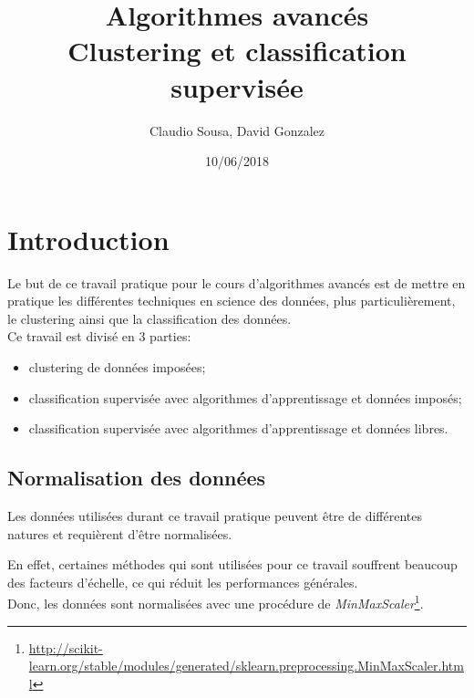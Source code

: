 \documentclass[11pt, a4paper]{article}
\begin{document}
\title
{
    \Huge{Algorithmes avancés} \\
    \Huge{Clustering et classification supervisée}
}
\author
{
    \LARGE{Claudio Sousa, David Gonzalez}
}
\date{10/06/2018}
\maketitle

\thispagestyle{empty}


\newpage

\section{Introduction}

Le but de ce travail pratique pour le cours d'algorithmes avancés est de mettre en pratique
les différentes techniques en science des données,
plus particulièrement, le clustering ainsi que la classification des données. \\

Ce travail est divisé en 3 parties:
\begin{itemize}
    \item clustering de données imposées;
    \item classification supervisée avec algorithmes d'apprentissage et données imposés;
    \item classification supervisée avec algorithmes d'apprentissage et données libres.
\end{itemize}

\subsection{Normalisation des données}

Les données utilisées durant ce travail pratique peuvent être de différentes natures et
requièrent d'être normalisées.

En effet, certaines méthodes qui sont utilisées pour ce travail souffrent beaucoup des facteurs d'échelle,
ce qui réduit les performances générales. \\

Donc, les données sont normalisées avec une procédure de \textit{MinMaxScaler}\footnote{\url{http://scikit-learn.org/stable/modules/generated/sklearn.preprocessing.MinMaxScaler.html}}.

\newpage
\end{document}
